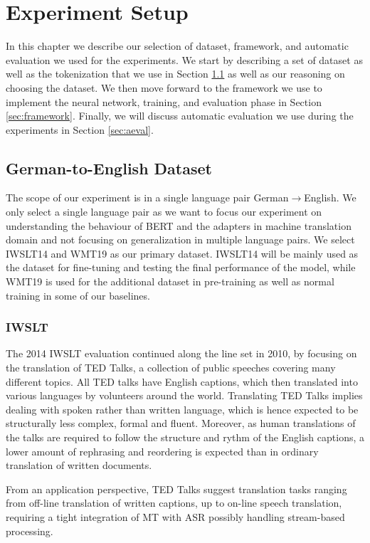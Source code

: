 
\chapter{Experiment Setup}
In this chapter we describe our selection of dataset, framework, and automatic evaluation we used for the experiments. We start by describing a set of dataset as well as the tokenization that we use in Section \ref{sec:dataset} as well as our reasoning on choosing the dataset. We then move forward to the framework we use to implement the neural network, training, and evaluation phase in Section \ref{sec:framework}. Finally, we will discuss automatic evaluation we use during the experiments in Section \ref{sec:aeval}.

\section{German-to-English Dataset}
\label{sec:dataset}
The scope of our experiment is in a single language pair German$\rightarrow$English. We only select a single language pair as we want to focus our experiment on understanding the behaviour of BERT and the adapters in machine translation domain and not focusing on generalization in multiple language pairs. We select IWSLT14 and WMT19 as our primary dataset. IWSLT14 will be mainly used as the dataset for fine-tuning and testing the final performance of the model, while WMT19 is used for the additional dataset in pre-training as well as normal training in some of our baselines.

\subsection{IWSLT}
The 2014 IWSLT evaluation \cite{Cettolo2014ReportOT} continued along the line set in 2010, by focusing on the translation of TED Talks, a collection of public speeches covering many different topics. All TED talks have English captions, which then translated into various languages by volunteers around the world. Translating TED Talks implies dealing with spoken rather than written language, which is hence expected to be structurally less complex, formal and fluent. Moreover, as human translations of the talks are required to follow the structure and rythm of the English captions, a lower amount of rephrasing and reordering is expected than in ordinary translation of written documents.

From an application perspective, TED Talks suggest translation tasks ranging from off-line translation of written captions, up to on-line speech translation, requiring a tight integration of MT with ASR possibly handling stream-based processing.

